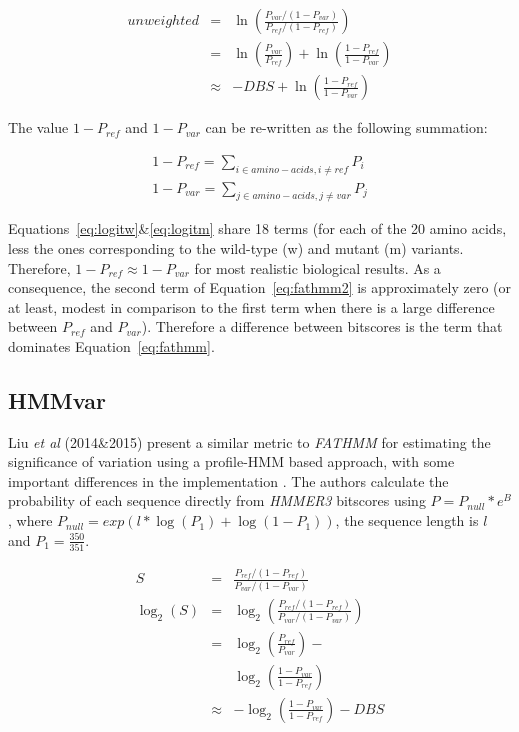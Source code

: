 \documentclass[fleqn,10pt]{SelfArx} %
\begin{document}
\begin{eqnarray}
\label{eq:fathmm}
unweighted &=& \ln \left( \frac{P_{var}/(1-P_{var})}{P_{ref}/(1-P_{ref})} \right)\\
\label{eq:fathmm1}
           &=& \ln \left( \frac{P_{var}}{P_{ref}} \right) + \ln \left( \frac{1-P_{ref}}{1-P_{var}} \right) \\ %
\label{eq:fathmm2}
           &\approx& -DBS + \ln \left( \frac{1-P_{ref}}{1-P_{var}} \right)                                
\end{eqnarray}

The value $1-P_{ref}$ and  $1-P_{var}$ can be re-written as the following summation: 

\begin{eqnarray} 
\label{eq:logitw}
1-P_{ref}=\sum_{i\in{amino-acids},i\ne ref} P_i\\
\label{eq:logitm}
1-P_{var}=\sum_{j\in{amino-acids},j\ne var} P_j
\end{eqnarray}

Equations~\ref{eq:logitw}\&\ref{eq:logitm} share 18 terms (for each of
the 20 amino acids, less the ones corresponding to the wild-type (w)
and mutant (m) variants. Therefore, $1-P_{ref} \approx 1-P_{var}$ for most
realistic biological results. As a consequence, the second term of
Equation~\ref{eq:fathmm2} is approximately zero (or at least, modest
in comparison to the first term when there is a large difference
between $P_{ref}$ and $P_{var}$). Therefore a difference between bitscores is
the term that dominates Equation~\ref{eq:fathmm}.%

\subsection{HMMvar}

Liu \emph{et al} (2014\&2015) present a similar metric to \emph{FATHMM}
for estimating the significance of variation using a profile-HMM based
approach, with some important differences in the implementation
\cite{Liu:2014,Liu:2015}.  The authors calculate the probability of
each sequence directly from \emph{HMMER3} bitscores using $P =
P_{null} *e^B$, where $P_{null} = exp(l*\log(P_1)+\log(1-P_1))$, the
sequence length is $l$ and $P_1 = \frac{350}{351}$.

\begin{eqnarray}
\label{eq:hmmvar}
S &=&  \frac{P_{ref}/(1-P_{ref})}{P_{var}/(1-P_{var})} \\
\log_2\left(S\right) &=&  \log_2\left(\frac{P_{ref}/(1-P_{ref})}{P_{var}/(1-P_{var})}\right) \\
                     &=&  \log_2\left(\frac{P_{ref}}{P_{var}}\right) - \\ 
                     & &  \log_2\left(\frac{1-P_{var}}{1-P_{ref}}\right) \\
                     &\approx& -\log_2\left(\frac{1-P_{var}}{1-P_{ref}}\right) - DBS
\end{eqnarray}
\end{document}
